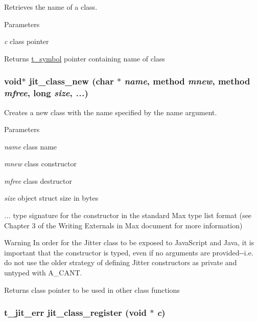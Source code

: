 Retrieves the name of a class. 
\begin{DoxyParams}{Parameters}
\item[{\em c}]class pointer\end{DoxyParams}
\begin{DoxyReturn}{Returns}
\hyperlink{structt__symbol}{t\_\-symbol} pointer containing name of class 
\end{DoxyReturn}
\hypertarget{group__classmod_ga6c1c213a5c883bf32d0f22678ce2f02b}{
\subsubsection[{jit\_\-class\_\-new}]{\setlength{\rightskip}{0pt plus 5cm}void$\ast$ jit\_\-class\_\-new (char $\ast$ {\em name}, \/  {\bf method} {\em mnew}, \/  {\bf method} {\em mfree}, \/  long {\em size}, \/   {\em ...})}}
\label{group__classmod_ga6c1c213a5c883bf32d0f22678ce2f02b}


Creates a new class with the name specified by the name argument. 
\begin{DoxyParams}{Parameters}
\item[{\em name}]class name \item[{\em mnew}]class constructor \item[{\em mfree}]class destructor \item[{\em size}]object struct size in bytes \item[{\em ...}]type signature for the constructor in the standard Max type list format (see Chapter 3 of the Writing Externals in Max document for more information) \end{DoxyParams}
\begin{DoxyWarning}{Warning}
In order for the Jitter class to be exposed to JavaScript and Java, it is important that the constructor is typed, even if no arguments are provided-\/-\/i.e. do not use the older strategy of defining Jitter constructors as private and untyped with A\_\-CANT.
\end{DoxyWarning}
\begin{DoxyReturn}{Returns}
class pointer to be used in other class functions 
\end{DoxyReturn}
\hypertarget{group__classmod_ga1cf03eba09d7b3b53a8cde269c47765d}{
\subsubsection[{jit\_\-class\_\-register}]{\setlength{\rightskip}{0pt plus 5cm}t\_\-jit\_\-err jit\_\-class\_\-register (void $\ast$ {\em c})}}
\label{group__classmod_ga1cf03eba09d7b3b53a8cde269c47765d}


